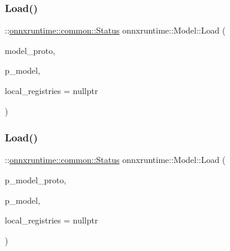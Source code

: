 \mbox{\label{classonnxruntime_1_1Model_a61473df4c76c5914c712737804f8c79d}} 
\subsubsection{\texorpdfstring{Load()}{Load()}\hspace{0.1cm}{\footnotesize\ttfamily [4/5]}}
{\footnotesize\ttfamily \+::\mbox{\hyperlink{classonnxruntime_1_1common_1_1Status}{onnxruntime\+::common\+::\+Status}} onnxruntime\+::\+Model\+::\+Load (\begin{DoxyParamCaption}\item[{const O\+N\+N\+X\+\_\+\+N\+A\+M\+E\+S\+P\+A\+C\+E\+::\+Model\+Proto \&}]{model\+\_\+proto,  }\item[{std\+::shared\+\_\+ptr$<$ \mbox{\hyperlink{classonnxruntime_1_1Model}{Model}} $>$ \&}]{p\+\_\+model,  }\item[{const \mbox{\hyperlink{namespaceonnxruntime_a37a91305e7190e83fa9c66117a6a4746}{I\+Onnx\+Runtime\+Op\+Schema\+Registry\+List}} $\ast$}]{local\+\_\+registries = {\ttfamily nullptr} }\end{DoxyParamCaption})\hspace{0.3cm}{\ttfamily [static]}}

\mbox{\label{classonnxruntime_1_1Model_ac3349b0c44c0adacf291f6ea79abf210}} 
\subsubsection{\texorpdfstring{Load()}{Load()}\hspace{0.1cm}{\footnotesize\ttfamily [5/5]}}
{\footnotesize\ttfamily \+::\mbox{\hyperlink{classonnxruntime_1_1common_1_1Status}{onnxruntime\+::common\+::\+Status}} onnxruntime\+::\+Model\+::\+Load (\begin{DoxyParamCaption}\item[{std\+::unique\+\_\+ptr$<$ O\+N\+N\+X\+\_\+\+N\+A\+M\+E\+S\+P\+A\+C\+E\+::\+Model\+Proto $>$}]{p\+\_\+model\+\_\+proto,  }\item[{std\+::shared\+\_\+ptr$<$ \mbox{\hyperlink{classonnxruntime_1_1Model}{Model}} $>$ \&}]{p\+\_\+model,  }\item[{const \mbox{\hyperlink{namespaceonnxruntime_a37a91305e7190e83fa9c66117a6a4746}{I\+Onnx\+Runtime\+Op\+Schema\+Registry\+List}} $\ast$}]{local\+\_\+registries = {\ttfamily nullptr} }\end{DoxyParamCaption})\hspace{0.3cm}{\ttfamily [static]}}

